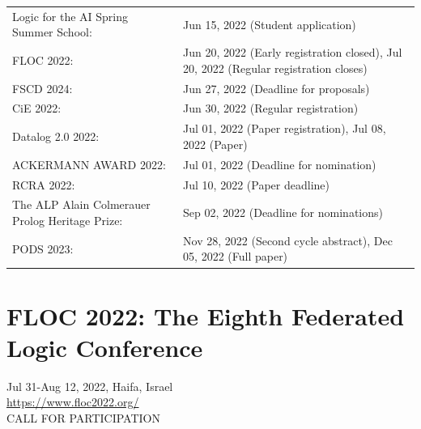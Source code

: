 \documentclass[prodmode,acmtecs]{acmsmall} %
\begin{document}
\begin{tabulary}{\linewidth}{LL}
Logic for the AI Spring Summer School:  & Jun 15, 2022 (Student application) \\
FLOC 2022:  & Jun 20, 2022 (Early registration closed), Jul 20, 2022 (Regular registration closes) \\
FSCD 2024:  & Jun 27, 2022 (Deadline for proposals) \\
CiE 2022:  & Jun 30, 2022 (Regular registration) \\
Datalog 2.0 2022:  & Jul 01, 2022 (Paper registration), Jul 08, 2022 (Paper) \\
ACKERMANN AWARD 2022:  & Jul 01, 2022 (Deadline for nomination) \\
RCRA 2022:  & Jul 10, 2022 (Paper  deadline) \\
The ALP Alain Colmerauer Prolog Heritage Prize:  & Sep 02, 2022 (Deadline for nominations) \\
PODS 2023:  & Nov 28, 2022 (Second cycle abstract), Dec 05, 2022 (Full paper) \\
\end{tabulary}
\section{FLOC 2022: The Eighth Federated Logic Conference}\label{FLOC2022}  Jul 31-Aug 12, 2022, Haifa, Israel \\ 
  \href{https://www.floc2022.org/}{https://www.floc2022.org/}\\ 
CALL FOR PARTICIPATION 
\end{document}
